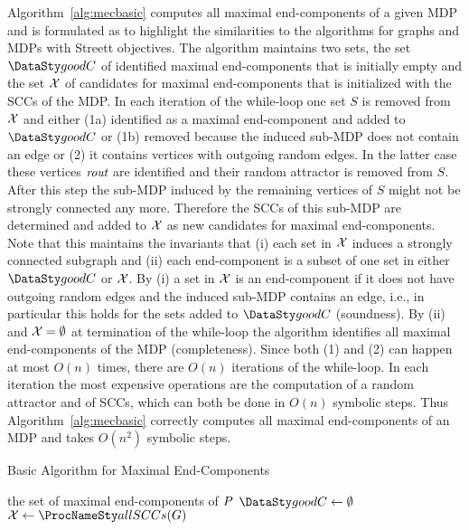 Algorithm~\ref{alg:mecbasic} computes all maximal end-components of
a given MDP and is formulated as to highlight the similarities to the algorithms
for graphs and MDPs with Streett objectives.
The algorithm maintains two sets, the set $\goodC$ of identified maximal 
end-components that is initially empty and the set $\mathcal{X}$ of candidates 
for maximal end-components that is initialized with the SCCs of 
the MDP. In each iteration of the while-loop one set $S$ is removed from 
$\mathcal{X}$ and either (1a) identified as a maximal end-component and added 
to $\goodC$ or (1b) removed because the induced sub-MDP does not contain an edge
or (2) it contains vertices with outgoing random edges. In the latter case 
these vertices $\textit{rout}$ are identified and their random attractor is removed from 
$S$. After this step the sub-MDP induced by the remaining vertices 
of $S$ might not be strongly connected any more. Therefore the SCCs of this 
sub-MDP are determined and added to $\mathcal{X}$ as new candidates 
for maximal end-components. Note that this maintains the invariants that 
(i) each set in $\mathcal{X}$ induces a strongly connected subgraph and 
(ii) each end-component is a subset of one set in either 
$\goodC$ or $\mathcal{X}$. By (i) a set in $\mathcal{X}$ is an end-component
if it does not have outgoing random edges and the induced sub-MDP contains an edge, 
i.e., in particular this holds for the sets added to $\goodC$ (soundness). By (ii) and 
$\mathcal{X} = \emptyset$ at termination of the while-loop
the algorithm identifies all maximal end-components of the MDP (completeness).
Since both (1) and (2) can happen at most $O(n)$ times, there are $O(n)$
iterations of the while-loop. 
In each iteration the most expensive operations are the computation
of a random attractor and of SCCs, which can both be done in $O(n)$ symbolic steps.
Thus Algorithm~\ref{alg:mecbasic} correctly computes all maximal end-components
of an MDP and takes $O(n^2)$ symbolic steps.

\begin{algorithm2e}[t]
	\caption{Basic Algorithm for Maximal End-Components}
	\label{alg:mecbasic}
	\BlankLine
	\Output
	{
	 the set of maximal end-components of $P$
	}
	\BlankLine
	$\goodC \gets \emptyset$\;
	$\mathcal{\ec} \gets \sccalg(G)$\;
	\Return{$\goodC$}\;
\end{algorithm2e}

